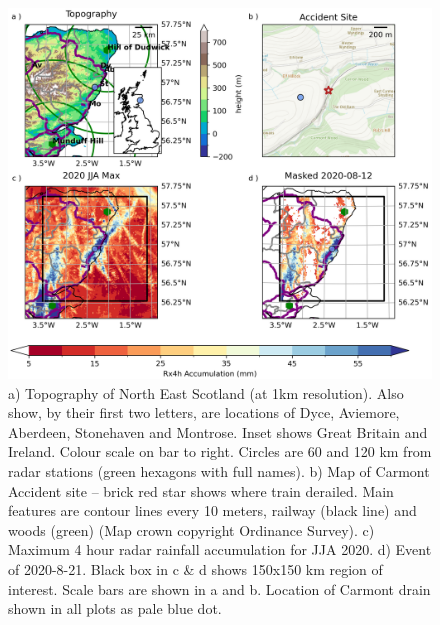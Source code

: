 \documentclass[11pt,a4paper]{article}
\begin{document}
%		




\pagebreak

\begin{figure}[tp]
	
	\centering
	\includegraphics[width=\linewidth]{carmont_geog_group.png}
	\caption{a) Topography of North East Scotland (at 1km resolution). Also show, by their first two letters, are locations of Dyce, Aviemore, Aberdeen, Stonehaven and Montrose. Inset shows Great Britain and Ireland. Colour scale on bar to right. Circles are  60 and 120 km from radar stations (green hexagons with full names). b)  Map of Carmont Accident site -- brick red star shows where train derailed. Main features are contour lines every 10 meters, railway (black line) and woods (green) (Map crown copyright Ordinance Survey).  c) Maximum 4 hour radar rainfall accumulation  for JJA 2020. d) Event of 2020-8-21.  Black box in c \& d shows 150x150 km region of interest. Scale bars are shown in a and b. Location of Carmont drain shown in all plots as pale blue dot.  }
	\label{fig:carmont_geog_group}
\end{figure}
\end{document}
